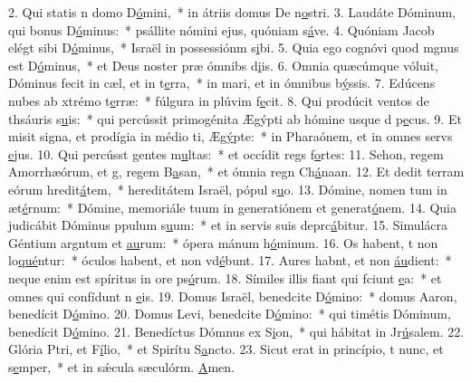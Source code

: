 2. Qui statis n domo D\uline{ó}mini,~* in átriis domus De n\uline{o}stri.
3. Laudáte Dóminum, qui bonus D\uline{ó}minus:~* psállite nómini ejus, quóniam s\uline{á}ve.
4. Quóniam Jacob elégt sibi D\uline{ó}minus,~* Israël in possessiónm s\uline{i}bi.
5. Quia ego cognóvi quod mgnus est D\uline{ó}minus,~* et Deus noster præ ómnibs d\uline{i}is.
6. Omnia quæcúmque vóluit, Dóminus fecit in cæl, et in t\uline{e}rra,~* in mari, et in ómnibus b\uline{ý}ssis.
7. Edúcens nubes ab xtrémo t\uline{e}rræ:~* fúlgura in plúvim f\uline{e}cit.
8. Qui prodúcit ventos de thsáuris s\uline{u}is:~* qui percússit primogénita Ægýpti ab hómine usque d p\uline{e}cus.
9. Et misit signa, et prodígia in médio ti, Æg\uline{ý}pte:~* in Pharaónem, et in omnes servs \uline{e}jus.
10. Qui percússt gentes m\uline{u}ltas:~* et occídit regs f\uline{o}rtes:
11. Sehon, regem Amorrhæórum, et g, regem B\uline{a}san,~* et ómnia regn Ch\uline{á}naan.
12. Et dedit terram eórum hredit\uline{á}tem,~* hereditátem Israël, pópul s\uline{u}o.
13. Dómine, nomen tum in æt\uline{é}rnum:~* Dómine, memoriále tuum in generatiónem et generat\uline{ó}nem.
14. Quia judicábit Dóminus ppulum s\uline{u}um:~* et in servis suis deprc\uline{á}bitur.
15. Simulácra Géntium argntum et \uline{au}rum:~* ópera mánum h\uline{ó}minum.
16. Os habent, t non lo\uline{qué}ntur:~* óculos habent, et non vd\uline{é}bunt.
17. Aures habnt, et non \uline{áu}dient:~* neque enim est spíritus in ore ps\uline{ó}rum.
18. Símiles illis fiant qui fciunt \uline{e}a:~* et omnes qui confídunt n \uline{e}is.
19. Domus Israël, benedcite D\uline{ó}mino:~* domus Aaron, benedícit D\uline{ó}mino.
20. Domus Levi, benedcite D\uline{ó}mino:~* qui timétis Dóminum, benedícit D\uline{ó}mino.
21. Benedíctus Dómnus ex S\uline{i}on,~* qui hábitat in Jr\uline{ú}salem.
22. Glória Ptri, et F\uline{í}lio,~* et Spirítu S\uline{a}ncto.
23. Sicut erat in princípio, t nunc, et s\uline{e}mper,~* et in sǽcula sæculórm. \uline{A}men.
